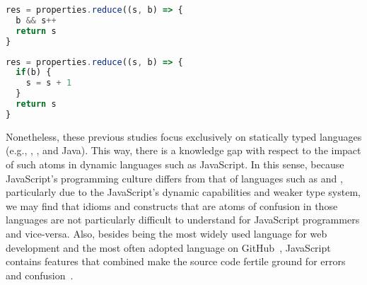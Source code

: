 \begin{figure*}[thb]
\noindent\begin{minipage}{.45\textwidth}  
\begin{lstlisting}[language=JavaScript]
res = properties.reduce((s, b) => {
  b && s++
  return s
}
\end{lstlisting}
\end{minipage}\hfill
\begin{minipage}{.45\textwidth}
\begin{lstlisting}[language=JavaScript]
res = properties.reduce((s, b) => {
  if(b) {
    s = s + 1
  }
  return s
}
\end{lstlisting}
\end{minipage}
\label{fig:lst01}
\end{figure*}

Nonetheless, these previous studies focus exclusively on statically typed languages (e.g., \clang, \cpplang, and Java). This way, there is a knowledge gap with respect to the impact of such atoms in dynamic languages such as JavaScript. In this sense, because JavaScript's programming culture differs from that of languages such as \clang and \cpplang, particularly due to the JavaScript's dynamic capabilities and weaker type system, we may find that idioms and constructs that are atoms of confusion in those languages are not particularly difficult to understand for JavaScript programmers and vice-versa. Also, besides being the most widely used language for web development and the most often adopted language on GitHub~\cite{BugsJS:ICST}, JavaScript contains features that combined make the source code fertile ground for errors~\cite{BugsJS:ICST,ClientSideBugsJS:TSE} and confusion~\cite{JSGoodParts:book}.

